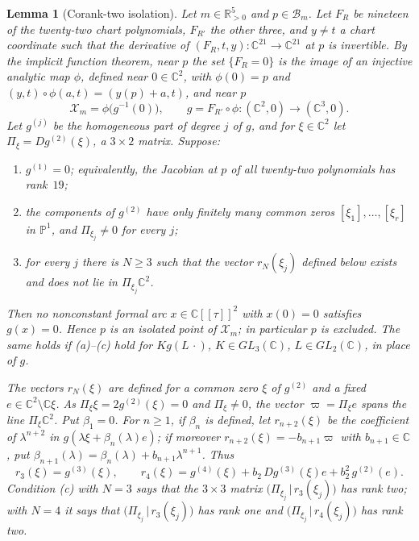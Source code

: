 \documentclass[Threeside,11pt]{article}
\newtheorem{lemma}[theorem]{Lemma}
\theoremstyle{definition}
\theoremstyle{remark}
\numberwithin{equation}{section}
\newcommand{\C}{\mathbb C}\newcommand{\T}{\mathbb T}
\theoremstyle{remark}
\newcommand{\Rp}{\mathbb{R}_{>0}}
\newenvironment{alphalist}{\begin{enumerate}\renewcommand{\labelenumi}{(\alph{enumi})}%
  \renewcommand{\theenumi}{\alph{enumi}}}{\end{enumerate}}
\begin{document}
\begin{lemma}[Corank-two isolation]\label{lem:d2-corank-two}
Let $m\in\Rp^5$ and $p\in\mathcal B_m$.  Let $F_R$ be nineteen of the twenty-two chart polynomials,
$F_{R'}$ the other three, and $y\ne t$ a chart coordinate such that the derivative of
$(F_R,t,y)\colon\C^{21}\to\C^{21}$ at $p$ is invertible.  By the implicit function theorem,
near $p$ the set $\{F_R=0\}$ is the image of an injective analytic map $\phi$, defined near
$0\in\C^2$, with $\phi(0)=p$ and $(y,t)\circ\phi(a,t)=(y(p)+a,t)$, and near $p$
\[
  \mathcal X_m=\phi\bigl(g^{-1}(0)\bigr),\qquad g=F_{R'}\circ\phi\colon(\C^2,0)\to(\C^3,0).
\]
Let $g^{(j)}$ be the homogeneous part of degree $j$ of $g$, and for $\xi\in\C^2$ let
$\Pi_\xi=Dg^{(2)}(\xi)$, a $3\times2$ matrix.  Suppose:
\begin{alphalist}
  \item $g^{(1)}=0$; equivalently, the Jacobian at $p$ of all twenty-two polynomials has
  rank~$19$;
  \item the components of $g^{(2)}$ have only finitely many common zeros $[\xi_1],\dots,[\xi_r]$
  in $\mathbb P^1$, and $\Pi_{\xi_j}\ne0$ for every $j$;
  \item for every $j$ there is $N\ge3$ such that the vector $r_N(\xi_j)$ defined below exists
  and does not lie in $\Pi_{\xi_j}\C^2$.
\end{alphalist}
Then no nonconstant formal arc $x\in\C[[\tau]]^2$ with $x(0)=0$ satisfies $g(x)=0$.  Hence $p$
is an isolated point of $\mathcal X_m$; in particular $p$ is excluded.  The same holds if
\textup{(a)--(c)} hold for $Kg(L\,\cdot)$, $K\in GL_3(\C)$, $L\in GL_2(\C)$, in place
of $g$.

The vectors $r_N(\xi)$ are defined for a common zero $\xi$ of $g^{(2)}$ and a fixed
$e\in\C^2\setminus\C\xi$.  As $\Pi_\xi\xi=2g^{(2)}(\xi)=0$ and $\Pi_\xi\ne0$, the vector
$\varpi=\Pi_\xi e$ spans the line $\Pi_\xi\C^2$.  Put $\beta_1=0$.  For $n\ge1$, if $\beta_n$ is
defined, let $r_{n+2}(\xi)$ be the coefficient of $\lambda^{n+2}$ in
$g(\lambda\xi+\beta_n(\lambda)e)$; if moreover $r_{n+2}(\xi)=-b_{n+1}\varpi$ with $b_{n+1}\in\C$,
put $\beta_{n+1}(\lambda)=\beta_n(\lambda)+b_{n+1}\lambda^{n+1}$.  Thus
\[
  r_3(\xi)=g^{(3)}(\xi),\qquad
  r_4(\xi)=g^{(4)}(\xi)+b_2\,Dg^{(3)}(\xi)e+b_2^2\,g^{(2)}(e).
\]
Condition (c) with $N=3$ says that the $3\times3$ matrix $\bigl(\Pi_{\xi_j}\,|\,r_3(\xi_j)\bigr)$
has rank two; with $N=4$ it says that $\bigl(\Pi_{\xi_j}\,|\,r_3(\xi_j)\bigr)$ has rank one and
$\bigl(\Pi_{\xi_j}\,|\,r_4(\xi_j)\bigr)$ has rank two.
\end{lemma}
\end{document}
